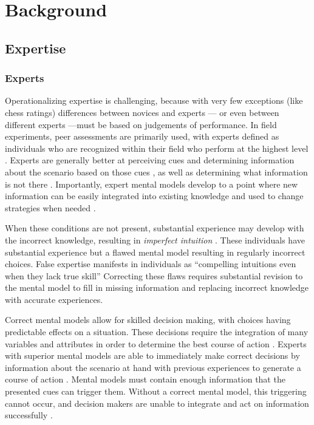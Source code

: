
\chapter{Background}

\section{Expertise}

\subsection{Experts}

Operationalizing expertise is challenging, because with very few exceptions (like chess ratings) differences between novices and experts --- or even between different experts ---must be based on judgements of performance. In field experiments, peer assessments are primarily used, with experts defined as individuals who are recognized within their field who perform at the highest level \citep{Kahneman2009}. Experts are generally better at perceiving cues and determining information about the scenario based on those cues \citep{Nee2006, Klein1999}, as well as determining what information is not there \citep{Klein1992}. Importantly, expert mental models develop to a point where new information can be easily integrated into existing knowledge and used to change strategies when needed \citep{Glaser1996}.

When these conditions are not present, substantial experience may develop with the incorrect knowledge, resulting in \emph{imperfect intuition} \citep{Kahneman2009}. These individuals have substantial experience but a flawed mental model resulting in regularly incorrect choices. False expertise manifests in individuals as ``compelling intuitions even when they lack true skill'' \citep{Kahneman2009} Correcting these flaws requires substantial revision to the mental model \citep{Klein2006, Chi2008} to fill in missing information and replacing incorrect knowledge with accurate experiences.

Correct mental models allow for skilled decision making, with choices having predictable effects on a situation. These decisions require the integration of many variables and attributes in order to determine the best course of action \citep{Klein2008}. Experts with superior mental models are able to immediately make correct decisions \citep{Klein1992} by information about the scenario at hand with previous experiences to generate a course of action \citep{Klein1999}. Mental models must contain enough information that the presented cues can trigger them. Without a correct mental model, this triggering cannot occur, and decision makers are unable to integrate and act on information successfully \citep{Lipshitz1997}.


